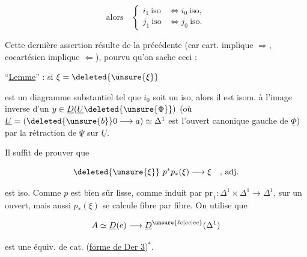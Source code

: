 


\[
\text{alors}\quad
\left\{\begin{aligned}i_1\ \text{iso}&\Longleftrightarrow i_0\ \text{iso},\\
j_1\ \text{iso}&\Longleftrightarrow j_0\ \text{iso}.\end{aligned}\right.
\]

Cette dernière assertion résulte de la précédente (car cart. implique $\Rightarrow$, cocartésien implique $\Leftarrow$), pourvu qu'on sache ceci :

``\uline{Lemme}''  : si $\xi=\deleted{\unsure{\xi}}$


est un diagramme substantiel tel que $i_0$ soit un iso, alors il est isom. à l'image inverse d'un $y\in\underline D(\underline U\deleted{\unsure{\Phi}})$ (où $\underline U=(\deleted{\unsure{b}}0\longrightarrow a)\simeq\Delta^1$ est l'ouvert canonique gauche de $\underline\Phi$) par la rétraction  de $\underline\Psi$ sur $\underline U$.


Il suffit de prouver que

\[
\deleted{\unsure{\xi}}\ p^*p_*(\xi)\longrightarrow\xi\quad\text{, adj.}
\]

est iso. Comme $p$ est bien sûr lisse, comme induit par $\mathrm{pr}_1\colon\Delta^1\times\Delta^1\longrightarrow\Delta^1$, sur un ouvert, mais aussi  $p_*(\xi)$ se calcule fibre par fibre. On utilise que 

\[
A\simeq\underline D(e)\longrightarrow\underline D^{\unsure{\ell c|ec|cc}}(\Delta^1)
\]

est une équiv. de cat. (\uline{forme de Der 3})$^*$.
